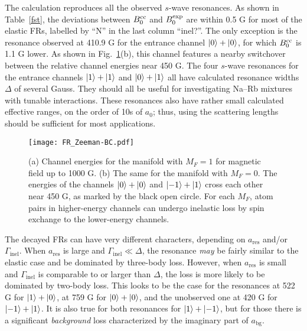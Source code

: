 The calculation reproduces all the observed $s$-wave resonances. As shown in Table~\ref{fst}, the deviations between $B_0^{\rm cc}$ and $B_0^{\rm exp}$ are within 0.5 G for most of the elastic FRs, labelled by ``N'' in the last column ``inel?''. The only exception is the resonance observed at 410.9 G for the entrance channel $\ket{0} + \ket{0}$, for which $B_0^{\rm cc}$ is 1.1 G lower. As shown in Fig.~\ref{FR_Zeeman-BC}(b), this channel features a nearby switchover between the relative channel energies near 450 G. The four $s$-wave resonances for the entrance channels $\ket{1}+\ket{1}$ and $\ket{0}+ \ket{1}$ all have calculated resonance widths $\Delta$ of several Gauss. They should all be useful for investigating Na--Rb mixtures with tunable interactions. These resonances also have rather small calculated effective ranges, on the order of 10s of $a_0$; thus, using the scattering lengths should be sufficient for most applications.

\begin{figure}[htb]
\begin{center}
\texttt{[image: FR\_Zeeman-BC.pdf]}
\end{center}
\caption[Zeeman energy for $M_F=1$ and $M_F=0$ channels]{(a) Channel energies for the manifold with $M_F = 1$ for magnetic field up to 1000 G. (b) The same for the manifold with $M_F = 0$. The energies of the channels $\ket{0}+\ket{0}$ and $\ket{-1}+\ket{1}$ cross each other near 450 G, as marked by the black open circle. For each $M_F$, atom pairs in higher-energy channels can undergo inelastic loss by spin exchange to the lower-energy channels.}
\label{FR_Zeeman-BC}
\end{figure}

The decayed FRs can have very different characters, depending on $a_\textrm{res}$ and/or $\Gamma_\textrm{inel}$. When $a_\textrm{res}$ is large and $\Gamma_\textrm{inel}\ll\Delta$, the resonance \emph{may} be fairly similar to the elastic case and be dominated by three-body loss. However, when $a_\textrm{res}$ is small and $\Gamma_\textrm{inel}$ is comparable to or larger than $\Delta$, the loss is more likely to be dominated by two-body loss. This looks to be the case for the resonances at 522 G for $\ket{1}+\ket{0}$, at 759 G for $\ket{0}+\ket{0}$, and the unobserved one at 420 G for $\ket{-1}+\ket{1}$. It is also true for both resonances for $\ket{1}+\ket{-1}$, but for those there is a significant \emph{background} loss characterized by the imaginary part of $a_\textrm{bg}$.


